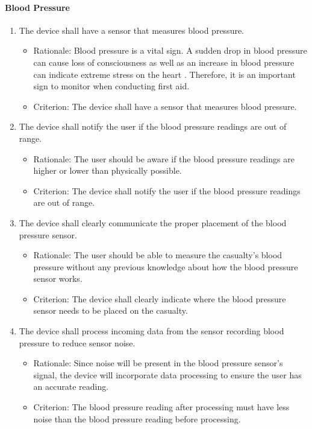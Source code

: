 \documentclass{article}
\begin{document}
        \paragraph{Blood Pressure}
    \begin{enumerate}[label = \textbf{{FR6.}\arabic*} ]
	    \item The device shall have a sensor that measures blood pressure.
            \begin{itemize}
                \item Rationale:  Blood pressure is a vital sign.  A sudden drop in blood pressure can cause loss of consciousness as well as an increase in blood pressure can indicate extreme stress on the heart \citep{shock}.  Therefore, it is an important sign to monitor when conducting first aid.  
                \item Criterion:  The device shall have a sensor that measures blood pressure.  
            \end{itemize}
	    
	    \item The device shall notify the user if the blood pressure readings are out of range.
            \begin{itemize}
                \item Rationale: The user should be aware if the blood pressure readings are higher or lower than physically possible.   
                \item Criterion: The device shall notify the user if the blood pressure readings are out of range.
            \end{itemize}  
            
        \item The device shall clearly communicate the proper placement of the blood pressure sensor.
            \begin{itemize}
                \item Rationale: The user should be able to measure the casualty's blood pressure without any previous knowledge about how the blood pressure sensor works. 
                \item Criterion: The device shall clearly indicate where the blood pressure sensor needs to be placed on the casualty.
            \end{itemize}  
	    
	   \item The device shall process incoming data from the sensor recording blood pressure to reduce sensor noise.
            \begin{itemize}
                \item Rationale:  Since noise will be present in the blood pressure sensor's signal, the device will incorporate data processing to ensure the user has an accurate reading.
                \item Criterion: The blood pressure reading after processing must have less noise than the blood pressure reading before processing.
            \end{itemize}
	    

\end{enumerate}
\end{document}
